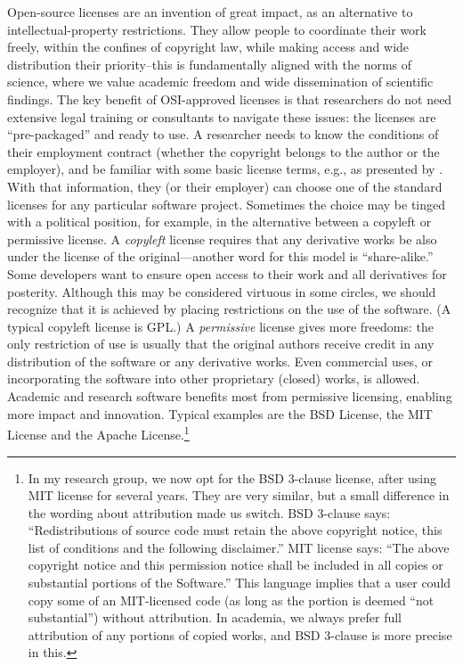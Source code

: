 \documentclass{statement}
\newlength{\up}
\begin{document}
Open-source licenses are an invention of great impact, as an alternative to intellectual-property restrictions. 
They allow people to coordinate their work freely, within the confines of copyright law, while making access and wide distribution their priority--this is fundamentally aligned with the norms of science, where we value academic freedom and wide dissemination of scientific findings. 
The key benefit of OSI-approved licenses is that researchers do not need extensive legal training or consultants to navigate these issues: 
the licenses are ``pre-packaged'' and ready to use. 
A researcher needs to know the conditions of their employment contract (whether the copyright belongs to the author or the employer), and be familiar with some basic license terms, e.g., as presented by \cite{morin2012}. 
With that information, they (or their employer) can choose one of the standard licenses for any particular software project. 
Sometimes the choice may be tinged with a political position, for example, in the alternative between a copyleft or permissive license. 
A \emph{copyleft} license requires that any derivative works be also under the license of the original---another word for this model is ``share-alike.'' 
Some developers want to ensure open access to their work and all derivatives for  posterity. 
Although this may be considered virtuous in some circles, we should recognize that it is achieved by placing restrictions on the use of the software. 
(A typical copyleft license is GPL.) 
A \emph{permissive} license gives more freedoms: the only restriction of use is usually that the original authors receive credit in any distribution of the software or any derivative works. 
Even commercial uses, or incorporating the software into other proprietary (closed) works, is allowed. 
Academic and research software benefits most from permissive licensing, enabling more impact and innovation. 
Typical examples are the BSD License, the MIT License and the Apache License.\footnote{In my research group, we now opt for the BSD 3-clause license, after using MIT license for several years. They are very similar, but a small difference in the wording about attribution made us switch. BSD 3-clause says: ``Redistributions of source code must retain the above copyright notice, this list of conditions and the following disclaimer.'' MIT license says: ``The above copyright notice and this permission notice shall be included in all copies or substantial portions of the Software.'' This language implies that a user could copy some of an MIT-licensed code (as long as the portion is deemed ``not substantial'') without attribution. In academia, we always prefer full attribution of any portions of copied works, and BSD 3-clause is more precise in this.}
\end{document}
